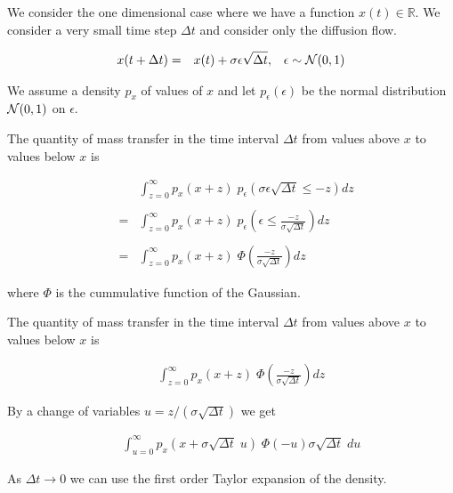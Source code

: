 {


{\Large
We consider the one dimensional case where we have a function $x(t) \in \mathbb{R}$.  We consider a very small time step $\Delta t$ and consider only the diffusion flow.

\begin{eqnarray*}
x(t + \Delta t) & = & x(t) + \sigma \epsilon \sqrt{\Delta t},\;\;\;\epsilon \sim {\cal N}(0,1)
\end{eqnarray*}

\vfill
We assume a density $p_x$ of values of $x$ and let $p_\epsilon(\epsilon)$ be the normal distribution ${\cal N}(0,1)$ on $\epsilon$.

\vfill
The quantity of mass transfer in the time interval $\Delta t$ from values above $x$ to values below $x$ is

\begin{eqnarray*}
& & \int_{z = 0}^\infty  p_x(x + z)\;p_\epsilon(\sigma\epsilon\sqrt{\Delta t} \leq -z) dz  \\
\\
& = & \int_{z = 0}^\infty  p_x(x + z)\;p_\epsilon\left(\epsilon \leq \frac{-z}{\sigma\sqrt{\Delta t}}\right) dz  \\
\\
& =  & \int_{z = 0}^\infty p_x(x+z)\;\Phi\left(\frac{-z}{\sigma\sqrt{\Delta t}}\right) dz
\end{eqnarray*}

\vfill
where $\Phi$ is the cummulative function of the Gaussian.
}

{\Large

The quantity of mass transfer in the time interval $\Delta t$ from values above $x$ to values below $x$ is


\begin{eqnarray*}
&  & \int_{z = 0}^\infty p_x(x+z)\;\Phi\left(\frac{-z}{\sigma\sqrt{\Delta t}}\right) dz
\end{eqnarray*}

By a change of variables $u = z/(\sigma\sqrt{\Delta t})$ we get

\begin{eqnarray*}
&  & \int_{u = 0}^\infty p_x(x+\sigma\sqrt{\Delta t}\;u)\;\Phi(-u) \sigma\sqrt{\Delta t}\;du
\end{eqnarray*}

\vfill
As $\Delta t \rightarrow 0$ we can use the first order Taylor expansion of the density.

}}
